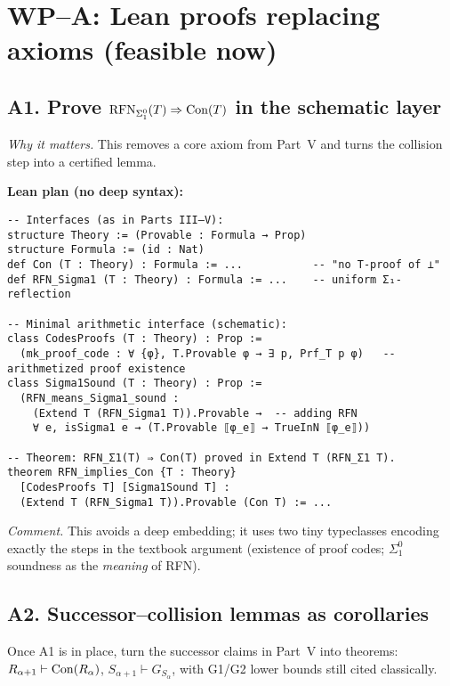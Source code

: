 \documentclass[11pt]{article}
\theoremstyle{definition}
\theoremstyle{remark}
\begin{document}
\section{WP–A: Lean proofs replacing axioms (feasible now)}

\subsection{A1. Prove $\mathrm{RFN}_{\Sigma^0_1}(T)\Rightarrow \mathrm{Con}(T)$ in the schematic layer}
\emph{Why it matters.} This removes a core axiom from Part~V and turns the collision step into a certified lemma.

\medskip\noindent
\textbf{Lean plan (no deep syntax):}
\begin{verbatim}
-- Interfaces (as in Parts III–V):
structure Theory := (Provable : Formula → Prop)
structure Formula := (id : Nat)
def Con (T : Theory) : Formula := ...           -- "no T-proof of ⊥"
def RFN_Sigma1 (T : Theory) : Formula := ...    -- uniform Σ₁-reflection

-- Minimal arithmetic interface (schematic):
class CodesProofs (T : Theory) : Prop :=
  (mk_proof_code : ∀ {φ}, T.Provable φ → ∃ p, Prf_T p φ)   -- arithmetized proof existence
class Sigma1Sound (T : Theory) : Prop :=
  (RFN_means_Sigma1_sound :
    (Extend T (RFN_Sigma1 T)).Provable →  -- adding RFN
    ∀ e, isSigma1 e → (T.Provable ⟦φ_e⟧ → TrueInN ⟦φ_e⟧))

-- Theorem: RFN_Σ1(T) ⇒ Con(T) proved in Extend T (RFN_Σ1 T).
theorem RFN_implies_Con {T : Theory}
  [CodesProofs T] [Sigma1Sound T] :
  (Extend T (RFN_Sigma1 T)).Provable (Con T) := ...
\end{verbatim}

\emph{Comment.} This avoids a deep embedding; it uses two tiny typeclasses encoding exactly the steps in the textbook argument (existence of proof codes; $\Sigma^0_1$ soundness as the \emph{meaning} of RFN).

\subsection{A2. Successor–collision lemmas as corollaries}
Once A1 is in place, turn the successor claims in Part~V into theorems: 
\(
R_{\alpha+1}\vdash \mathrm{Con}(R_\alpha)\), 
\(S_{\alpha+1}\vdash G_{S_\alpha}\),
with G1/G2 lower bounds still cited classically.

\end{document}

